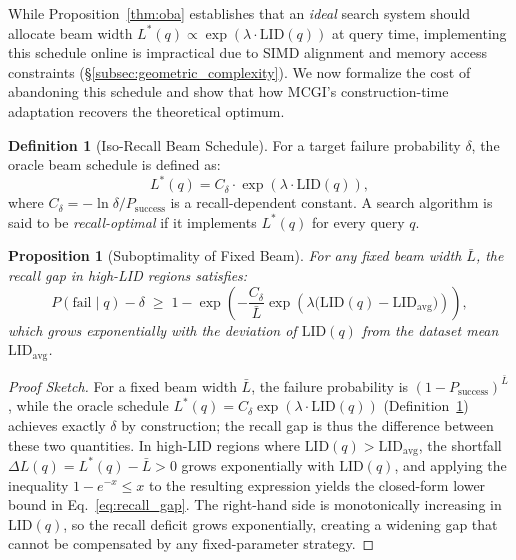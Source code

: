 \documentclass{article}
\theoremstyle{plain}
\newtheorem{proposition}[theorem]{Proposition}
\theoremstyle{definition}
\newtheorem{definition}[theorem]{Definition}
\theoremstyle{remark}
\begin{document}
While Proposition~\ref{thm:oba} establishes that an \emph{ideal}
search system should allocate beam width
$L^*(q) \propto \exp(\lambda \cdot \mathrm{LID}(q))$ at query time,
implementing this schedule online is impractical due to SIMD
alignment and memory access constraints
(\S\ref{subsec:geometric_complexity}).
We now formalize the cost of abandoning this schedule and show
that how MCGI's construction-time adaptation recovers the theoretical
optimum.

\begin{definition}[Iso-Recall Beam Schedule]
\label{def:iso_recall}
For a target failure probability $\delta$, the oracle beam schedule
is defined as:
\begin{equation}
    L^*(q) = C_\delta \cdot \exp\!\left(\lambda \cdot
    \mathrm{LID}(q)\right),
    \label{eq:oracle_schedule}
\end{equation}
where $C_\delta = -\ln\delta / P_{\mathrm{success}}$ is a
recall-dependent constant. A search algorithm is said to be
\emph{recall-optimal} if it implements $L^*(q)$ for every query $q$.
\end{definition}

\begin{proposition}[Suboptimality of Fixed Beam]
\label{prop:fixed_beam}
For any fixed beam width $\bar{L}$, the recall gap in high-LID
regions satisfies:
\begin{equation}
    P(\mathrm{fail} \mid q) - \delta \;\geq\;
    1 - \exp\!\left(
        -\frac{C_\delta}{\bar{L}}
        \exp\!\left(\lambda\bigl(\mathrm{LID}(q)
        - \mathrm{LID}_{\mathrm{avg}}\bigr)\right)
    \right),
    \label{eq:recall_gap}
\end{equation}
which grows exponentially with the deviation of $\mathrm{LID}(q)$
from the dataset mean $\mathrm{LID}_{\mathrm{avg}}$.
\end{proposition}

\begin{proof}[Proof Sketch]
For a fixed beam width $\bar{L}$, the failure probability is
$(1-P_{\text{success}})^{\bar{L}}$, while the oracle schedule
$L^*(q) = C_\delta \exp(\lambda \cdot \text{LID}(q))$
(Definition~\ref{def:iso_recall}) achieves exactly $\delta$ by
construction; the recall gap is thus the difference between these
two quantities.
In high-LID regions where $\text{LID}(q) > \text{LID}_{\text{avg}}$,
the shortfall $\Delta L(q) = L^*(q) - \bar{L} > 0$ grows
exponentially with $\text{LID}(q)$, and applying the inequality
$1 - e^{-x} \leq x$ to the resulting expression yields the
closed-form lower bound in Eq.~\eqref{eq:recall_gap}.
The right-hand side is monotonically increasing in $\text{LID}(q)$,
so the recall deficit grows exponentially, creating a widening gap that cannot be compensated by any
fixed-parameter strategy.
\end{proof}
\end{document}
